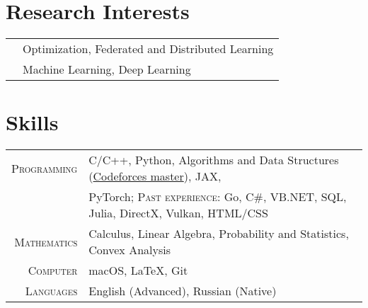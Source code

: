 \section{Research Interests}
\begin{tabular}{cl}
	&  Optimization, Federated and Distributed Learning\\
	&Machine Learning, Deep Learning
\end{tabular}

\section{Skills}

\begin{tabular}{rl}
	\textsc{Programming} & C/C++, Python,
	Algorithms and Data Structures (\href{https://codeforces.com/profile/Dakovalev1}{Codeforces master}), JAX,\\
	&PyTorch; \textsc{Past experience:} Go, C\#, VB.NET, SQL, Julia, DirectX, Vulkan, HTML/CSS\\
	\textsc{Mathematics} & Calculus, Linear Algebra, Probability and Statistics, Convex Analysis\\
	\textsc{Computer} & macOS, LaTeX, Git\\
		\textsc{Languages} & English (Advanced), Russian (Native)
\end{tabular}


%
